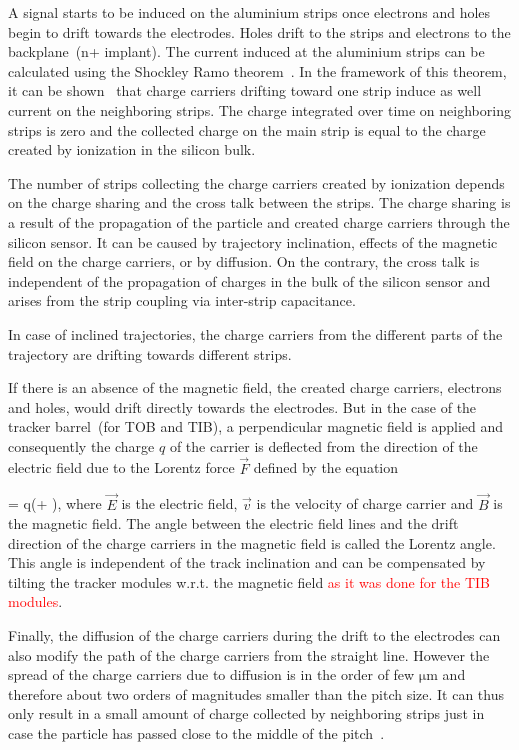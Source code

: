 A signal starts to be induced on the aluminium strips once electrons and holes begin to drift towards the electrodes. Holes drift to the strips and electrons to the backplane~(n+ implant). The current induced at the aluminium strips can be calculated using the Shockley Ramo theorem~\cite{doi:10.1063/1.1710367,Ramo:1939vr}. In the framework of this theorem, it can be shown~\cite{Bloch:2007zza} that charge carriers drifting toward one strip induce as well current on the neighboring strips. The charge integrated over time on neighboring strips is zero and the collected charge on the main strip is equal to the charge created by ionization in the silicon bulk.

The number of strips collecting the charge carriers created by ionization depends on the charge sharing and the cross talk between the strips. The charge sharing is a result of the propagation of the particle and created charge carriers through the silicon sensor. It can be caused by trajectory inclination, effects of the magnetic field on the charge carriers, or by diffusion. On the contrary, the cross talk is independent of the propagation of charges in the bulk of the silicon sensor and arises from the strip coupling via inter-strip capacitance.  

In case of inclined trajectories, the charge carriers from the different parts of the trajectory are drifting towards different strips. 

If there is an absence of the magnetic field, the created charge carriers, electrons and holes, would drift directly towards the electrodes. But in the case of the tracker barrel~(for TOB and TIB), a perpendicular magnetic field is applied  and consequently  the charge $q$ of the carrier is deflected from the direction of the electric field due to the Lorentz force $\vec{F}$ defined by the equation

{
   =  q(+ \times {}),
}
where $\vec{E}$ is the electric field, $\vec{v}$ is the velocity of charge carrier and $\vec{B}$ is the magnetic field. The angle between the electric field lines and the drift direction of the charge carriers in the magnetic field is called the Lorentz angle. This angle is independent of the track inclination and can be compensated by tilting the tracker modules w.r.t. the magnetic field \textcolor{red}{as it was done for the TIB modules}.

Finally, the diffusion of the charge carriers during the drift to the electrodes can also modify the path of the charge carriers from the straight line. However the spread of the charge carriers due to diffusion is in  the order of few $\mathrm{\mu m}$ and therefore about two orders of magnitudes smaller than the pitch size. It can thus only result in a small amount of charge collected by neighboring strips just in case the particle has passed close to the middle of the pitch~\cite{Bloch:2007zza}.



